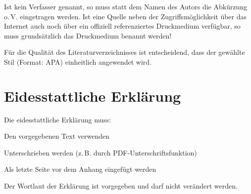 Ist kein Verfasser genannt, so muss statt dem Namen des Autors die Abkürzung o.\,V. eingetragen werden. Ist eine Quelle neben der Zugriffsmöglichkeit über das Internet auch noch über ein offiziell referenziertes Druckmedium verfügbar, so muss grundsätzlich das Druckmedium benannt werden!

Für die Qualität des Literaturverzeichnisses ist entscheidend, dass der gewählte Stil (Format: APA) einheitlich angewendet wird.

\section{Eidesstattliche Erklärung}
\label{sec:eidesstattliche_erklaerung}

Die eidesstattliche Erklärung muss:
\begin{listenabsatz}
	\item Den vorgegebenen Text verwenden
	\item Unterschrieben werden (z.\,B. durch PDF-Unterschriftsfunktion)
	\item Als letzte Seite vor dem Anhang eingefügt werden
\end{listenabsatz}

Der Wortlaut der Erklärung ist vorgegeben und darf nicht verändert werden.

